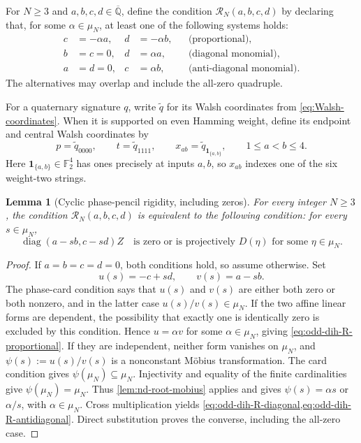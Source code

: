 \documentclass[11pt,letterpaper,onecolumn]{article}
\theoremstyle{plain}
\newtheorem{lemma}[lemma]{Lemma}
\theoremstyle{definition}
\theoremstyle{remark}
\newcommand{\AlgNums}{\overline{\mathbb Q}}
\newcommand{\Ftwo}{\mathbb F_2}
\newcommand{\diag}{\operatorname{diag}}
\newcommand{\one}{\mathbf 1}
\begin{document}
For \(N\ge3\) and \(a,b,c,d\in\AlgNums\), define the condition
\(\mathcal R_N(a,b,c,d)\) by declaring that, for some \(\alpha\in\mu_N\), at least
one of the following systems holds:
\begin{align}
  c&=-\alpha a,&d&=-\alpha b,
  &&\text{(proportional)},
  \label{eq:odd-dih-R-proportional}\\
  b&=c=0,&d&=\alpha a,
  &&\text{(diagonal monomial)},
  \label{eq:odd-dih-R-diagonal}\\
  a&=d=0,&c&=\alpha b,
  &&\text{(anti-diagonal monomial)}.
  \label{eq:odd-dih-R-antidiagonal}
\end{align}
The alternatives may overlap and include the all-zero quadruple.

For a quaternary signature \(q\), write \(\widetilde q\) for its
Walsh coordinates from \cref{eq:Walsh-coordinates}. When it is
supported on even Hamming weight, define its endpoint and central Walsh
coordinates by
\begin{equation}
  p=\widetilde q_{0000},\qquad
  t=\widetilde q_{1111},\qquad
  x_{ab}=\widetilde q_{\one_{\{a,b\}}},\qquad 1\le a<b\le4.
  \label{eq:odd-dih-q4-coordinates}
\end{equation}
Here \(\one_{\{a,b\}}\in\Ftwo^4\) has ones precisely at inputs
\(a,b\), so \(x_{ab}\) indexes one of the six weight-two strings.

\begin{lemma}[Cyclic phase-pencil rigidity, including zeros]
\label{lem:odd-dih-RN}
For every integer \(N\ge3\), the condition
\(\mathcal R_N(a,b,c,d)\) is equivalent to the following
condition: for every \(s\in\mu_N\),
\[
  \diag(a-sb,c-sd)Z
  \quad\text{is zero or is projectively }D(\eta)
  \text{ for some }\eta\in\mu_N.
\]
\end{lemma}

\begin{proof}
If \(a=b=c=d=0\), both conditions hold, so assume otherwise.  Set
\[
  u(s)=-c+sd,\qquad v(s)=a-sb.
\]
The phase-card condition says that \(u(s)\) and \(v(s)\) are either both zero
or both nonzero, and in the latter case
\(u(s)/v(s)\in\mu_N\).  If the two affine linear forms are dependent, the
possibility that exactly one is identically zero is excluded by this
condition.  Hence \(u=\alpha v\) for some \(\alpha\in\mu_N\), giving
\cref{eq:odd-dih-R-proportional}.  If they are independent, neither form
vanishes on \(\mu_N\), and
\(\psi(s):=u(s)/v(s)\) is a nonconstant M\"obius
transformation.  The card condition gives
\(\psi(\mu_N)\subseteq\mu_N\). Injectivity and equality of the finite
cardinalities give \(\psi(\mu_N)=\mu_N\).  Thus
\cref{lem:nd-root-mobius} applies and gives
\(\psi(s)=\alpha s\) or \(\alpha/s\), with
\(\alpha\in\mu_N\).  Cross multiplication yields
\cref{eq:odd-dih-R-diagonal,eq:odd-dih-R-antidiagonal}.  Direct substitution
proves the converse, including the all-zero case.
\end{proof}
\end{document}
